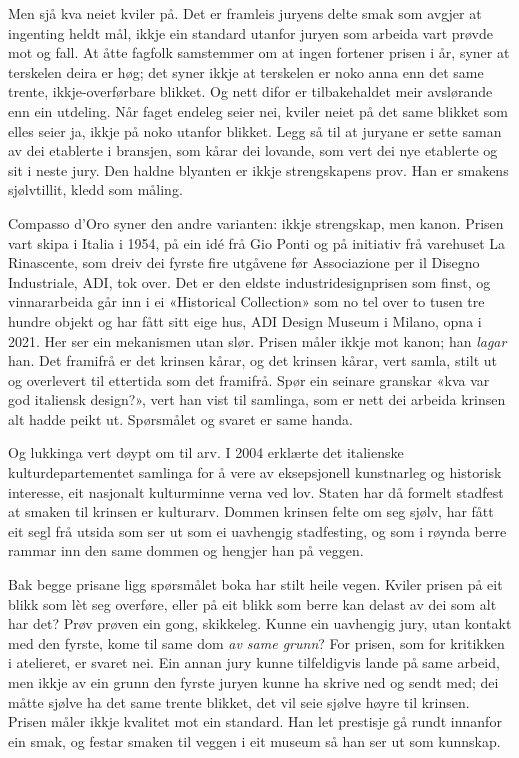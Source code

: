 Men sjå kva neiet kviler på. Det er framleis juryens delte smak som avgjer at ingenting heldt mål, ikkje ein standard utanfor juryen som arbeida vart prøvde mot og fall. At åtte fagfolk samstemmer om at ingen fortener prisen i år, syner at terskelen deira er høg; det syner ikkje at terskelen er noko anna enn det same trente, ikkje-overførbare blikket. Og nett difor er tilbakehaldet meir avslørande enn ein utdeling. Når faget endeleg seier nei, kviler neiet på det same blikket som elles seier ja, ikkje på noko utanfor blikket. Legg så til at juryane er sette saman av dei etablerte i bransjen, som kårar dei lovande, som vert dei nye etablerte og sit i neste jury. Den haldne blyanten er ikkje strengskapens prov. Han er smakens sjølvtillit, kledd som måling.

Compasso d'Oro syner den andre varianten: ikkje strengskap, men kanon. Prisen vart skipa i Italia i 1954, på ein idé frå Gio Ponti og på initiativ frå varehuset La Rinascente, som dreiv dei fyrste fire utgåvene før Associazione per il Disegno Industriale, ADI, tok over. Det er den eldste industridesignprisen som finst, og vinnararbeida går inn i ei «Historical Collection» som no tel over to tusen tre hundre objekt og har fått sitt eige hus, ADI Design Museum i Milano, opna i 2021. Her ser ein mekanismen utan slør. Prisen måler ikkje mot kanon; han \emph{lagar} han. Det framifrå er det krinsen kårar, og det krinsen kårar, vert samla, stilt ut og overlevert til ettertida som det framifrå. Spør ein seinare granskar «kva var god italiensk design?», vert han vist til samlinga, som er nett dei arbeida krinsen alt hadde peikt ut. Spørsmålet og svaret er same handa.

Og lukkinga vert døypt om til arv. I 2004 erklærte det italienske kulturdepartementet samlinga for å vere av eksepsjonell kunstnarleg og historisk interesse, eit nasjonalt kulturminne verna ved lov. Staten har då formelt stadfest at smaken til krinsen er kulturarv. Dommen krinsen felte om seg sjølv, har fått eit segl frå utsida som ser ut som ei uavhengig stadfesting, og som i røynda berre rammar inn den same dommen og hengjer han på veggen.

Bak begge prisane ligg spørsmålet boka har stilt heile vegen. Kviler prisen på eit blikk som lèt seg overføre, eller på eit blikk som berre kan delast av dei som alt har det? Prøv prøven ein gong, skikkeleg. Kunne ein uavhengig jury, utan kontakt med den fyrste, kome til same dom \emph{av same grunn}? For prisen, som for kritikken i atelieret, er svaret nei. Ein annan jury kunne tilfeldigvis lande på same arbeid, men ikkje av ein grunn den fyrste juryen kunne ha skrive ned og sendt med; dei måtte sjølve ha det same trente blikket, det vil seie sjølve høyre til krinsen. Prisen måler ikkje kvalitet mot ein standard. Han let prestisje gå rundt innanfor ein smak, og festar smaken til veggen i eit museum så han ser ut som kunnskap.

